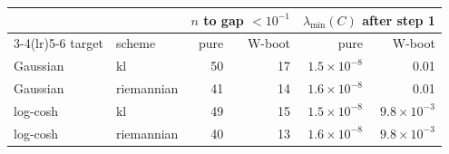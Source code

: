 \begin{tabular}{ll rr rr}
\toprule
 & & \multicolumn{2}{c}{$n$ to gap $<10^{-1}$} & \multicolumn{2}{c}{$\lambda_{\min}(C)$ after step 1} \\
\cmidrule(lr){3-4}\cmidrule(lr){5-6}
target & scheme & pure & W-boot & pure & W-boot \\
\midrule
Gaussian & kl & 50 & 17 & $1.5\times10^{-8}$ & 0.01 \\
Gaussian & riemannian & 41 & 14 & $1.6\times10^{-8}$ & 0.01 \\
log-cosh & kl & 49 & 15 & $1.5\times10^{-8}$ & $9.8\times10^{-3}$ \\
log-cosh & riemannian & 40 & 13 & $1.6\times10^{-8}$ & $9.8\times10^{-3}$ \\
\bottomrule
\end{tabular}
